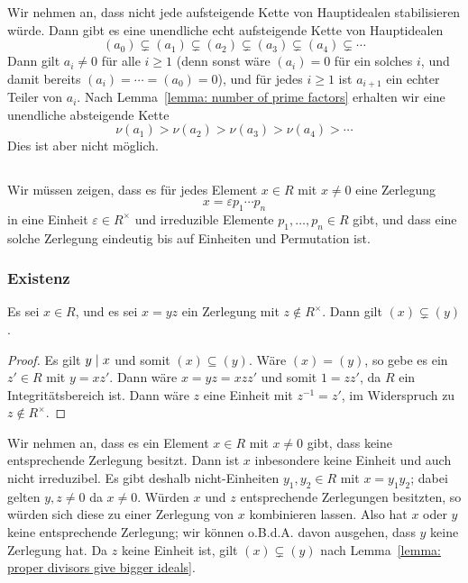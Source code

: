 \subsubsection{}

Wir nehmen an, dass nicht jede aufsteigende Kette von Hauptidealen stabilisieren würde.
Dann gibt es eine unendliche echt aufsteigende Kette von Hauptidealen
\[
              (a_0)
  \subsetneq  (a_1)
  \subsetneq  (a_2)
  \subsetneq  (a_3)
  \subsetneq  (a_4)
  \subsetneq  \dotsb
\]
Dann gilt $a_i \neq 0$ für alle $i \geq 1$ (denn sonst wäre $(a_i) = 0$ für ein solches $i$, und damit bereits $(a_i) = \dotsb = (a_0) = 0$), und für jedes $i \geq 1$ ist $a_{i+1}$ ein echter Teiler von $a_i$.
Nach Lemma~\ref{lemma: number of prime factors} erhalten wir eine unendliche absteigende Kette
\[
    \nu(a_1)
  > \nu(a_2)
  > \nu(a_3)
  > \nu(a_4)
  > \dotsb
\]
Dies ist aber nicht möglich.





\subsection{}

Wir müssen zeigen, dass es für jedes Element $x \in R$ mit $x \neq 0$ eine Zerlegung
\[
  x = \varepsilon p_1 \dotsm p_n
\]
in eine Einheit $\varepsilon \in R^\times$ und irreduzible Elemente $p_1, \dotsc, p_n \in R$ gibt,
und dass eine solche Zerlegung eindeutig bis auf Einheiten und Permutation ist.

\subsubsection*{Existenz}

\begin{lemma}
  \label{lemma: proper divisors give bigger ideals}
  Es sei $x \in R$, und es sei $x = yz$ ein Zerlegung mit $z \notin R^\times$.
  Dann gilt $(x) \subsetneq (y)$.
\end{lemma}

\begin{proof}
  Es gilt $y \mathrel{|} x$ und somit $(x) \subseteq (y)$.
  Wäre $(x) = (y)$, so gebe es ein $z' \in R$ mit $y = xz'$.
  Dann wäre $x = yz = xzz'$ und somit $1 = zz'$, da $R$ ein Integritätsbereich ist.
  Dann wäre $z$ eine Einheit mit $z^{-1} = z'$, im Widerspruch zu $z \notin R^\times$.
\end{proof}

Wir nehmen an, dass es ein Element $x \in R$ mit $x \neq 0$ gibt, dass keine entsprechende Zerlegung besitzt.
Dann ist $x$ inbesondere keine Einheit und auch nicht irreduzibel.
Es gibt deshalb nicht-Einheiten $y_1, y_2 \in R$ mit $x = y_1 y_2$;
dabei gelten $y, z \neq 0$ da $x \neq 0$.
Würden $x$ und $z$ entsprechende Zerlegungen besitzten, so würden sich diese zu einer Zerlegung von $x$ kombinieren lassen.
Also hat $x$ oder $y$ keine entsprechende Zerlegung;
wir können o.B.d.A. davon ausgehen, dass $y$ keine Zerlegung hat.
Da $z$ keine Einheit ist, gilt $(x) \subsetneq (y)$ nach Lemma~\ref{lemma: proper divisors give bigger ideals}.

